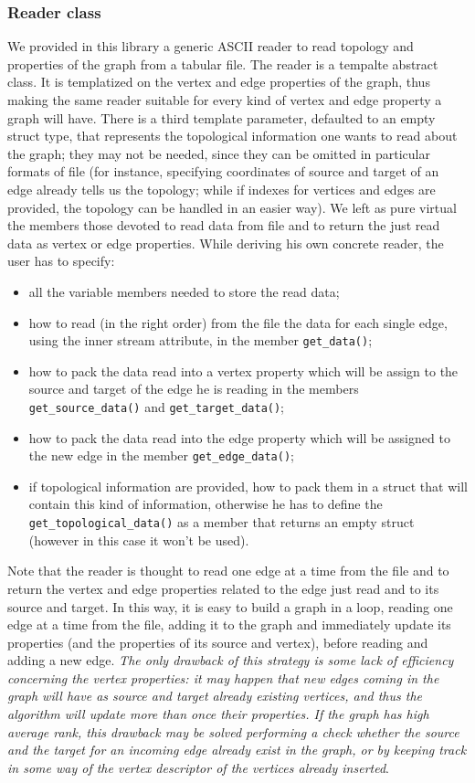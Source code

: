 \documentclass[11pt]{article} %
\begin{document}
		\subsubsection{Reader class}		
		We provided in this library a generic ASCII reader to read topology and properties of the graph from a tabular file. The reader is a tempalte abstract class. It is templatized on the vertex and edge properties of the graph, thus making the same reader suitable for every kind of vertex and edge property a graph will have. There is a third template parameter, defaulted to an empty struct type, that represents the topological information one wants to read about the graph; they may not be needed, since they can be omitted in particular formats of file (for instance, specifying coordinates of source and target of an edge already tells us the topology; while if indexes for vertices and edges are provided, the topology can be handled in an easier way). \newline
		We left as pure virtual the members those devoted to read data from file and to return the just read data as vertex or edge properties. While deriving his own concrete reader, the user has to specify:
		\begin{itemize}
			\item all the variable members needed to store the read data;
			\item how to read (in the right order) from the file the data for each single edge, using the inner stream attribute, in the member \texttt{get\_data()};
			\item how to pack the data read into a vertex property which will be assign to the source and target of the edge he is reading in the members \texttt{get\_source\_data()} and \texttt{get\_target\_data()};
			\item how to pack the data read into the edge property which will be assigned to the new edge in the member \texttt{get\_edge\_data()};
			\item if topological information are provided, how to pack them in a struct that will contain this kind of information, otherwise he has to define the \texttt{get\_topological\_data()} as a member that returns an empty struct (however in this case it won't be used).
		\end{itemize}
		Note that the reader is thought to read one edge at a time from the file and to return the vertex and edge properties related to the edge just read and to its source and target. In this way, it is easy to build a graph in a loop, reading one edge at a time from the file, adding it to the graph and immediately update its properties (and the properties of its source and vertex), before reading and adding a new edge. \textsl{The only drawback of this strategy is some lack of efficiency concerning the vertex properties: it may happen that new edges coming in the graph will have as source and target already existing vertices, and thus the algorithm will update more than once their properties. If the graph has high average rank, this drawback may be solved performing a check whether the source and the target for an incoming edge already exist in the graph, or by keeping track in some way of the vertex descriptor of the vertices already inserted}. \newline
\end{document}
